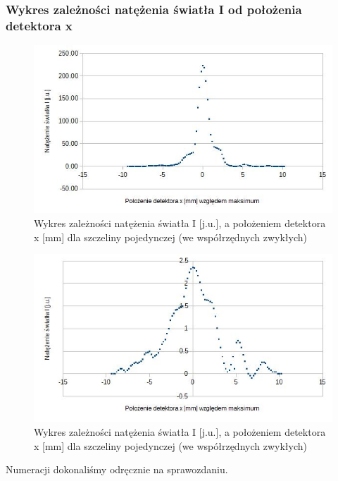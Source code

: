 \documentclass{article}
\begin{document}
\subsubsection{Wykres zależności natężenia światła I od położenia detektora x}
\begin{figure}[h!]
	\centering
	\includegraphics[scale=0.65]{ch03}
	\caption{Wykres zależności natężenia światła I [j.u.], a położeniem detektora x [mm] dla szczeliny pojedynczej (we współrzędnych zwykłych)}
\end{figure}
\begin{figure}[h!]
	\centering
	\includegraphics[scale=0.65]{ch04}
	\caption{Wykres zależności natężenia światła I [j.u.], a położeniem detektora x [mm] dla szczeliny pojedynczej (we współrzędnych zwykłych)}
\end{figure}
Numeracji dokonaliśmy odręcznie na sprawozdaniu.
\end{document}
